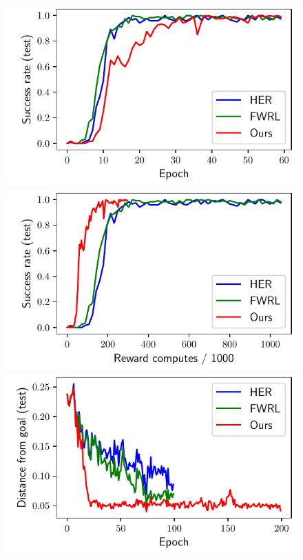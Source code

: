 \begin{figure}
  \includegraphics[width=\frac\columnwidth]{media/res/6efc1de-path_reward_low_thresh_chosen-FetchPushPR-v1-dqst/epoch-test/success_rate.pdf}%
  \includegraphics[width=\frac\columnwidth]{media/res/6efc1de-path_reward_low_thresh_chosen-FetchPushPR-v1-dqst/reward_computes-test/success_rate.pdf}\\
  \includegraphics[width=\frac\columnwidth]{media/res/6efc1de-path_reward_low_thresh_chosen-FetchPickAndPlacePR-v1-dqst/epoch-test/ag_g_dist.pdf}

\end{figure}
